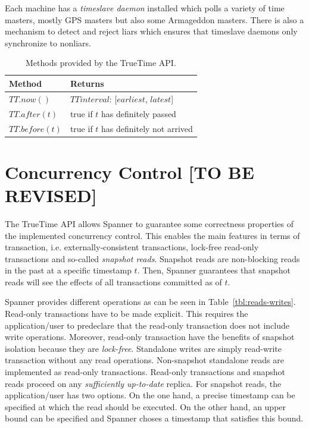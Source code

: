 \documentclass[onecolumn, a4paper, 10pt]{article}
\newcommand{\tbr}{{\color{red}\textbf{[TO BE REVISED]}}}
\begin{document}
Each machine has a \emph{timeslave daemon} installed which polls a variety of
time masters, mostly GPS masters but also some Armageddon masters. There is also
a mechanism to detect and reject liars which ensures that timeslave daemons only
synchronize to nonliars. 

\begin{table}[ht]
  \centering
  \begin{tabular}{|l||l|}
    \hline
    {\bfseries Method} & {\bfseries Returns} \tabularnewline
    \hline\hline
    $TT.now()$ & $TTinterval$: [$earliest$, $latest$] \tabularnewline
    \hline
    $TT.after(t)$ & true if $t$ has definitely passed \tabularnewline
    \hline
    $TT.before(t)$ & true if $t$ has definitely not arrived \tabularnewline
    \hline
  \end{tabular}
  \caption{Methods provided by the TrueTime API.}
  \label{tbl:truetime-api}
\end{table}

\section{Concurrency Control \tbr}
\label{sec:concurrency-control}

The TrueTime API allows Spanner to guarantee some correctness properties of the
implemented concurrency control. This enables the main features in terms of
transaction, i.e. externally-consistent transactions, lock-free read-only
transactions and so-called \emph{snapshot reads}. Snapshot reads are non-blocking
reads in the past at a specific timestamp $t$. Then, Spanner guarantees that
snapshot reads will see the effects of all transactions committed as of $t$.

Spanner provides different operations as can be seen in
Table~\ref{tbl:reads-writes}. Read-only transactions have to be made explicit.
This requires the application/user to predeclare that the read-only transaction
does not include write operations. Moreover, read-only transaction have the
benefits of snapshot isolation because they are \emph{lock-free}. Standalone
writes are simply read-write transaction without any read operations. Non-snapshot
standalone reads are implemented as read-only transactions. Read-only transactions
and snapshot reads proceed on any \emph{sufficiently up-to-date} replica. For
snapshot reads, the application/user has two options. On the one hand, a precise
timestamp can be specified at which the read should be executed. On the other
hand, an upper bound can be specified and Spanner choses a timestamp that
satisfies this bound. 
\end{document}
